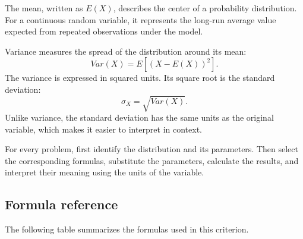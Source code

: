	The mean, written as $E(X)$, describes the center of a probability distribution.
	For a continuous random variable, it represents the long-run average value
	expected from repeated observations under the model.
	
	Variance measures the spread of the distribution around its mean:
	\[
	Var(X)=E\left[(X-E(X))^2\right].
	\]
	The variance is expressed in squared units.  Its square root is the standard
	deviation:
	\[
	\sigma_X=\sqrt{Var(X)}.
	\]
	Unlike variance, the standard deviation has the same units as the original
	variable, which makes it easier to interpret in context.
	
	For every problem, first identify the distribution and its parameters.  Then
	select the corresponding formulas, substitute the parameters, calculate the
	results, and interpret their meaning using the units of the variable.
	
	\subsection{Formula reference}\label{sec:c4-intro-formulas}
	
	The following table summarizes the formulas used in this criterion.
	
